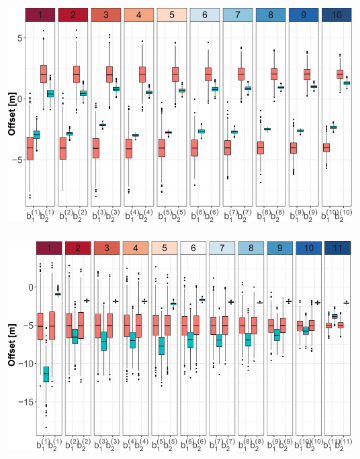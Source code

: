 \documentclass[11pt]{article}
\begin{document}
\begin{figure}[h!]
        \begin{subfigure}{0.48\textwidth}
            \centering
            \includegraphics[width=\linewidth]{Figs/7c-bs_Pt.pdf}
            \caption{}
            \label{subfig:B'sPt}
        \end{subfigure}
        \begin{subfigure}{0.49\textwidth}
            \centering
            \includegraphics[width=\linewidth]{Figs/7d-bs_Restit.pdf}
            \caption{}
            \label{subfig:B'sRes}
        \end{subfigure}
        

\end{figure}
\end{document}
